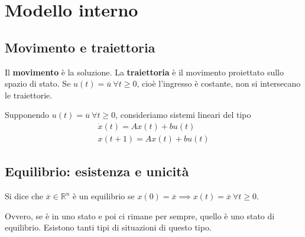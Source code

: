 \chapter{Modello interno}

\section{Movimento e traiettoria}

Il \textbf{movimento} è la soluzione. La \textbf{traiettoria} è il movimento proiettato sullo spazio di stato. Se $u(t) =\overline{u} \ \forall t\geq 0$, cioè l'ingresso è costante, non si intersecano le traiettorie.

Supponendo $u(t) =\overline{u} \ \forall t\geq 0$, consideriamo sistemi lineari del tipo
\begin{gather*}
	\dot{x} (t)=Ax(t)+bu(t)\\
	x(t+1)=Ax(t)+bu(t)
\end{gather*}

\section{Equilibrio: esistenza e unicità}

\begin{defn}
	Si dice che $\overline{x} \in \mathbb{R}^n$ è un equilibrio se $x(0) =\overline{x} \implies x(t) =\overline{x} \ \forall t\geq 0$.
\end{defn}
Ovvero, se è in uno stato e poi ci rimane per sempre, quello è uno stato di equilibrio. Esistono tanti tipi di situazioni di questo tipo.

